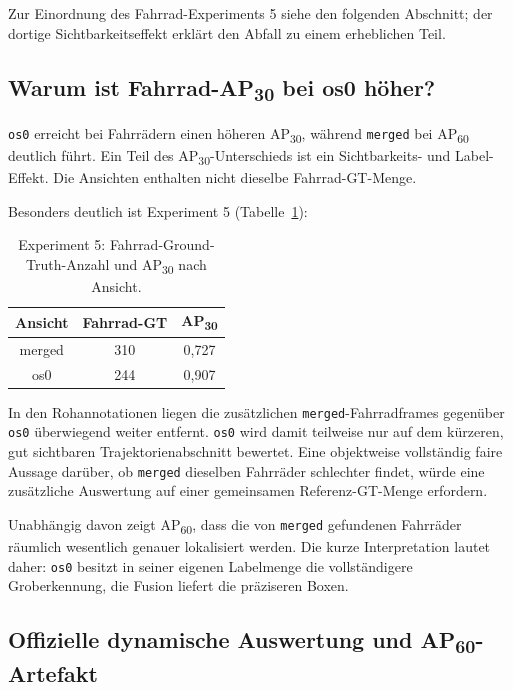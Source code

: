 Zur Einordnung des Fahrrad-Experiments 5 siehe den folgenden Abschnitt; der dortige Sichtbarkeitseffekt erklärt den Abfall zu einem erheblichen Teil.

\subsection{Warum ist Fahrrad-\texorpdfstring{AP\textsubscript{30}}{AP30} bei os0 höher?}

\texttt{os0} erreicht bei Fahrrädern einen höheren AP\textsubscript{30}, während \texttt{merged} bei AP\textsubscript{60} deutlich führt. Ein Teil des AP\textsubscript{30}-Unterschieds ist ein Sichtbarkeits- und Label-Effekt. Die Ansichten enthalten nicht dieselbe Fahrrad-GT-Menge.

Besonders deutlich ist Experiment 5 (Tabelle~\ref{tab:exp5-bicycle}):

\begin{table}[H]
\centering
\begin{tabular}{ccc}
\toprule
\textbf{Ansicht} & \textbf{Fahrrad-GT} & \textbf{AP\textsubscript{30}} \\
\midrule
merged & 310 & 0{,}727 \\
os0    & 244 & 0{,}907 \\
\bottomrule
\end{tabular}
\caption{Experiment 5: Fahrrad-Ground-Truth-Anzahl und AP\textsubscript{30} nach Ansicht.}
\label{tab:exp5-bicycle}
\end{table}

In den Rohannotationen liegen die zusätzlichen \texttt{merged}-Fahrradframes gegenüber \texttt{os0} überwiegend weiter entfernt. \texttt{os0} wird damit teilweise nur auf dem kürzeren, gut sichtbaren Trajektorienabschnitt bewertet. Eine objektweise vollständig faire Aussage darüber, ob \texttt{merged} dieselben Fahrräder schlechter findet, würde eine zusätzliche Auswertung auf einer gemeinsamen Referenz-GT-Menge erfordern.

Unabhängig davon zeigt AP\textsubscript{60}, dass die von \texttt{merged} gefundenen Fahrräder räumlich wesentlich genauer lokalisiert werden. Die kurze Interpretation lautet daher: \texttt{os0} besitzt in seiner eigenen Labelmenge die vollständigere Groberkennung, die Fusion liefert die präziseren Boxen.

\subsection{Offizielle dynamische Auswertung und \texorpdfstring{AP\textsubscript{60}}{AP60}-Artefakt}
\label{sec:ap60-artefakt}

